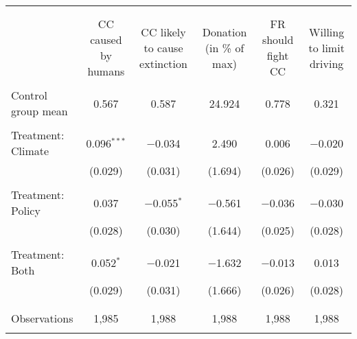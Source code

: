 
\begin{tabular}{@{\extracolsep{5pt}}lccccc} 
\\[-1.8ex]\hline 
\hline \\[-1.8ex] 
\\[-1.8ex] & CC caused by humans & CC likely to cause extinction & Donation (in \% of max) & FR should fight CC & Willing to limit driving \\ 
\hline \\[-1.8ex] 
 Control group mean & 0.567 & 0.587 & 24.924 & 0.778 & 0.321  \\ \hline \\[-1.8ex] Treatment: Climate & 0.096$^{***}$ & $-$0.034 & 2.490 & 0.006 & $-$0.020 \\ 
  & (0.029) & (0.031) & (1.694) & (0.026) & (0.029) \\ 
  & & & & & \\ 
 Treatment: Policy & 0.037 & $-$0.055$^{*}$ & $-$0.561 & $-$0.036 & $-$0.030 \\ 
  & (0.028) & (0.030) & (1.644) & (0.025) & (0.028) \\ 
  & & & & & \\ 
 Treatment: Both & 0.052$^{*}$ & $-$0.021 & $-$1.632 & $-$0.013 & 0.013 \\ 
  & (0.029) & (0.031) & (1.666) & (0.026) & (0.028) \\ 
  & & & & & \\ 
\hline \\[-1.8ex] 

Observations & 1,985 & 1,988 & 1,988 & 1,988 & 1,988 \\ 
\hline 
\hline \\[-1.8ex] 
\end{tabular} 